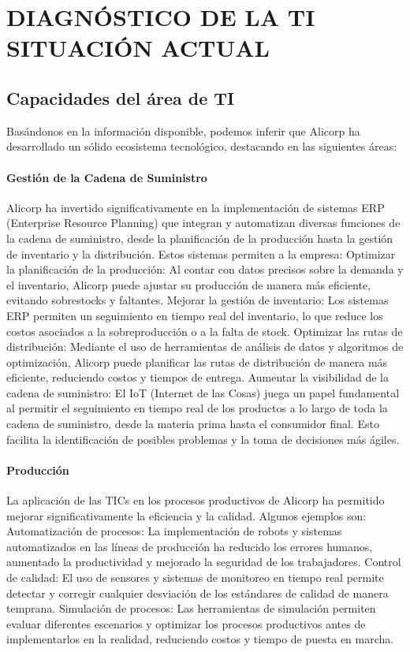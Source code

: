\section{DIAGNÓSTICO DE LA TI SITUACIÓN ACTUAL}
\subsection{Capacidades del área de TI}
    Basándonos en la información disponible, podemos inferir que Alicorp ha desarrollado un sólido ecosistema tecnológico, destacando en las siguientes áreas: 

        \paragraph*{Gestión de la Cadena de Suministro} 
        Alicorp ha invertido significativamente en la implementación de sistemas ERP (Enterprise Resource Planning) que integran y automatizan diversas funciones de la cadena de suministro, desde la planificación de la producción hasta la gestión de inventario y la distribución. Estos sistemas permiten a la empresa: 
        Optimizar la planificación de la producción: Al contar con datos precisos sobre la demanda y el inventario, Alicorp puede ajustar su producción de manera más eficiente, evitando sobrestocks y faltantes. 
        Mejorar la gestión de inventario: Los sistemas ERP permiten un seguimiento en tiempo real del inventario, lo que reduce los costos asociados a la sobreproducción o a la falta de stock. 
        Optimizar las rutas de distribución: Mediante el uso de herramientas de análisis de datos y algoritmos de optimización, Alicorp puede planificar las rutas de distribución de manera más eficiente, reduciendo costos y tiempos de entrega. 
        Aumentar la visibilidad de la cadena de suministro: El IoT (Internet de las Cosas) juega un papel fundamental al permitir el seguimiento en tiempo real de los productos a lo largo de toda la cadena de suministro, desde la materia prima hasta el consumidor final. Esto facilita la identificación de posibles problemas y la toma de decisiones más ágiles. 

        \paragraph*{Producción}
        La aplicación de las TICs en los procesos productivos de Alicorp ha permitido mejorar significativamente la eficiencia y la calidad. Algunos ejemplos son: 
        Automatización de procesos: La implementación de robots y sistemas automatizados en las líneas de producción ha reducido los errores humanos, aumentado la productividad y mejorado la seguridad de los trabajadores. 
        Control de calidad: El uso de sensores y sistemas de monitoreo en tiempo real permite detectar y corregir cualquier desviación de los estándares de calidad de manera temprana. 
        Simulación de procesos: Las herramientas de simulación permiten evaluar diferentes escenarios y optimizar los procesos productivos antes de implementarlos en la realidad, reduciendo costos y tiempo de puesta en marcha. 
    
